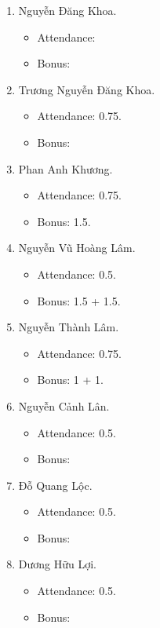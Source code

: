 \documentclass{article}
\begin{document}
\begin{enumerate}
\begin{itemize}
    \end{itemize}
    \item {\sc Nguyễn Đăng Khoa.}
    \begin{itemize}
        \item Attendance:
        \item Bonus:
    \end{itemize}
    \item {\sc Trương Nguyễn Đăng Khoa.}
    \begin{itemize}
        \item Attendance: 0.75.
        \item Bonus:
    \end{itemize}
    \item {\sc Phan Anh Khương.}
    \begin{itemize}
        \item Attendance: 0.75.
        \item Bonus: 1.5.
    \end{itemize}
    \item {\sc Nguyễn Vũ Hoàng Lâm.}
    \begin{itemize}
        \item Attendance: 0.5.
        \item Bonus: 1.5 + 1.5.
    \end{itemize}
    \item {\sc Nguyễn Thành Lâm.}
    \begin{itemize}
        \item Attendance: 0.75.
        \item Bonus: 1 + 1.
    \end{itemize}
    \item {\sc Nguyễn Cảnh Lân.}
    \begin{itemize}
        \item Attendance: 0.5.
        \item Bonus:
    \end{itemize}
    \item {\sc Đỗ Quang Lộc.}
    \begin{itemize}
        \item Attendance: 0.5.
        \item Bonus:
    \end{itemize}
    \item {\sc Dương Hữu Lợi.}
    \begin{itemize}
        \item Attendance: 0.5.
        \item Bonus:

\end{itemize}
\end{enumerate}
\end{document}
